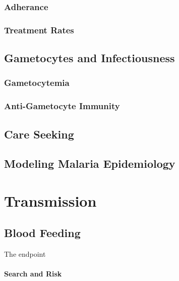 \documentclass[
]{book}
\begin{document}
\section{Adherance}\label{adherance}

\section{Treatment Rates}\label{treatment-rates}

\chapter{Gametocytes and Infectiousness}\label{gametocytes-and-infectiousness-1}

\section{Gametocytemia}\label{gametocytemia}

\section{Anti-Gametocyte Immunity}\label{anti-gametocyte-immunity}

\chapter{Care Seeking}\label{care-seeking}

\chapter{Modeling Malaria Epidemiology}\label{modeling-malaria-epidemiology}

\section{}\label{section-2}

\part{Transmission}\label{part-transmission}

\chapter{Blood Feeding}\label{blood-feeding-1}

The endpoint

\subsection{Search and Risk}\label{search-and-risk}
\end{document}
